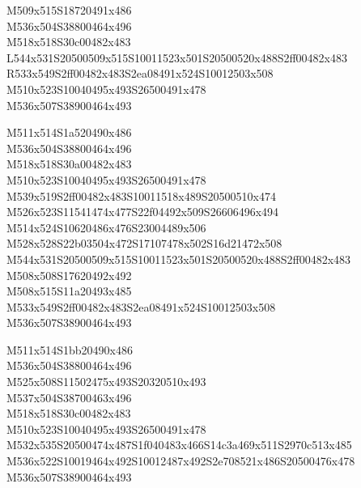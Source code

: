 \documentclass{article}
\begin{document}
\begin{multicols}{5}
\begin{center}

M509x515S18720491x486 %
\\M536x504S38800464x496 %
\\M518x518S30c00482x483 %
\\L544x531S20500509x515S10011523x501S20500520x488S2ff00482x483 %
\\R533x549S2ff00482x483S2ea08491x524S10012503x508 %
\\M510x523S10040495x493S26500491x478 %
\\M536x507S38900464x493 %
\vfil
\columnbreak

M511x514S1a520490x486 %
\\M536x504S38800464x496 %
\\M518x518S30a00482x483 %
\\M510x523S10040495x493S26500491x478 %
\\M539x519S2ff00482x483S10011518x489S20500510x474 %
\\M526x523S11541474x477S22f04492x509S26606496x494 %
\\M514x524S10620486x476S23004489x506 %
\\M528x528S22b03504x472S17107478x502S16d21472x508 %
\\M544x531S20500509x515S10011523x501S20500520x488S2ff00482x483 %
\\M508x508S17620492x492 %
\\M508x515S11a20493x485 %
\\M533x549S2ff00482x483S2ea08491x524S10012503x508 %
\\M536x507S38900464x493 %
\vfil
\columnbreak

M511x514S1bb20490x486 %
\\M536x504S38800464x496 %
\\M525x508S11502475x493S20320510x493 %
\\M537x504S38700463x496 %
\\M518x518S30c00482x483 %
\\M510x523S10040495x493S26500491x478 %
\\M532x535S20500474x487S1f040483x466S14c3a469x511S2970c513x485 %
\\M536x522S10019464x492S10012487x492S2e708521x486S20500476x478 %
\\M536x507S38900464x493 %
\vfil
\columnbreak


\end{center}
\end{multicols}
\end{document}
